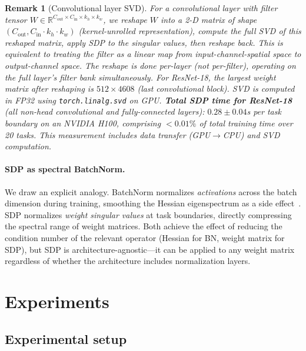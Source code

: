 \documentclass{article}
\newtheorem{remark}{Remark}
\newcommand{\RR}{\mathbb{R}}
\begin{document}
\begin{remark}[Convolutional layer SVD]
\label{rem:conv_svd}
For a convolutional layer with filter tensor $W \in \RR^{C_{\mathrm{out}} \times C_{\mathrm{in}} \times k_h \times k_w}$, we reshape $W$ into a 2-D matrix of shape $(C_{\mathrm{out}}, C_{\mathrm{in}} \cdot k_h \cdot k_w)$ (kernel-unrolled representation), compute the full SVD of this reshaped matrix, apply SDP to the singular values, then reshape back. This is equivalent to treating the filter as a linear map from input-channel-spatial space to output-channel space. The reshape is done per-layer (not per-filter), operating on the full layer's filter bank simultaneously. For ResNet-18, the largest weight matrix after reshaping is $512 \times 4608$ (last convolutional block). SVD is computed in FP32 using \texttt{torch.linalg.svd} on GPU. \textbf{Total SDP time for ResNet-18} (all non-head convolutional and fully-connected layers): $0.28 \pm 0.04$s per task boundary on an NVIDIA H100, comprising $<0.01\%$ of total training time over 20 tasks. This measurement includes data transfer (GPU$\to$CPU) and SVD computation.
\end{remark}

\paragraph{SDP as spectral BatchNorm.}
We draw an explicit analogy. BatchNorm normalizes \emph{activations} across the batch dimension during training, smoothing the Hessian eigenspectrum as a side effect~\citep{ghorbani2019investigation}. SDP normalizes \emph{weight singular values} at task boundaries, directly compressing the spectral range of weight matrices. Both achieve the effect of reducing the condition number of the relevant operator (Hessian for BN, weight matrix for SDP), but SDP is architecture-agnostic---it can be applied to any weight matrix regardless of whether the architecture includes normalization layers.

\section{Experiments}
\label{sec:experiments}

\subsection{Experimental setup}
\end{document}

